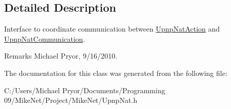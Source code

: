 \subsection{Detailed Description}
Interface to coordinate communication between \hyperlink{class_upnp_nat_action}{UpnpNatAction} and \hyperlink{class_upnp_nat_communication}{UpnpNatCommunication}. \begin{DoxyRemark}{Remarks}
Michael Pryor, 9/16/2010. 
\end{DoxyRemark}


The documentation for this class was generated from the following file:\begin{DoxyCompactItemize}
\item 
C:/Users/Michael Pryor/Documents/Programming 09/MikeNet/Project/MikeNet/UpnpNat.h\end{DoxyCompactItemize}
